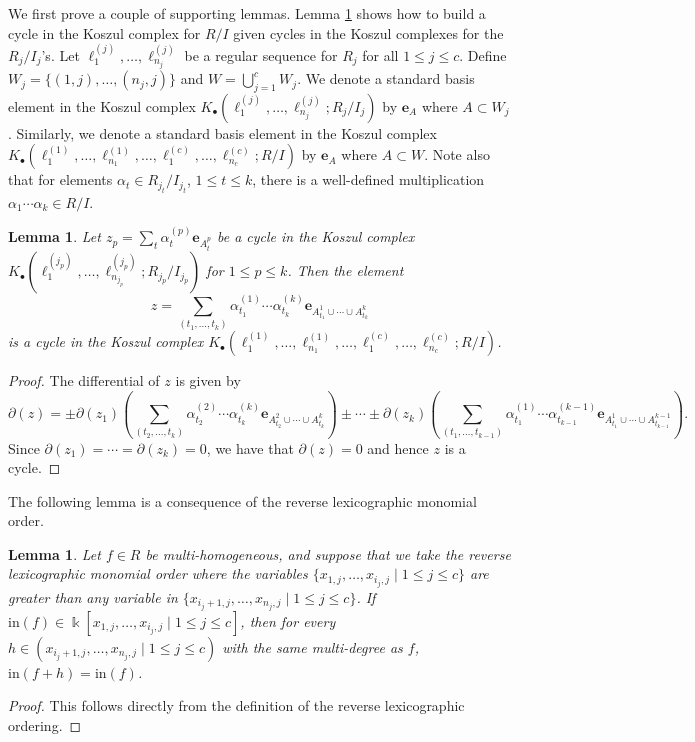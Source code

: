 \documentclass[a4paper, 10pt, reqno, english, ones]{amsart}  %
\newtheorem{lemma}[theorem]{Lemma}
\theoremstyle{definition}
\theoremstyle{remark}
\begin{document}
We first prove a couple of supporting lemmas. Lemma \ref{lem:Koszul Build} shows how to build a cycle in the Koszul complex for $R/I$ given cycles in the Koszul complexes for the $R_j/I_j$'s. Let $\ell_1^{(j)},\dots,\ell_{n_j}^{(j)}$ be a regular sequence for $R_j$ for all $1\leq j\leq c$. Define $W_j=\{(1,j),\dots,(n_j,j) \}$ and $W=\bigcup_{j=1}^c W_j$. We denote a standard basis element in the Koszul complex $K_\bullet (\ell_1^{(j)},\dots,\ell_{n_j}^{(j)};R_j/I_j)$ by $\mathbf{e}_A$ where $A\subset W_j$. Similarly, we denote a standard basis element in the Koszul complex $K_\bullet (\ell_1^{(1)},\dots,\ell_{n_1}^{(1)},\dots,\ell_1^{(c)},\dots,\ell_{n_c}^{(c)};R/I)$ by $\mathbf{e}_A$ where $A\subset W$. Note also that for elements $\alpha_t\in R_{j_t}/I_{j_t}$, $1\leq t\leq k$, there is a well-defined multiplication $\alpha_1\cdots \alpha_k \in R/I$. 

\begin{lemma}\label{lem:Koszul Build}
    Let $z_p=\sum_t \alpha_t^{(p)}\mathbf{e}_{A_t^{p}}$ be a cycle in the Koszul complex $K_\bullet (\ell_1^{(j_p)},\dots,\ell_{n_{j_p}}^{(j_p)};R_{j_p}/I_{j_p})$ for $1\leq p\leq k$. Then the element
    \[
    z=\sum_{(t_1,\dots,t_k)}  \alpha_{t_1}^{(1)}\cdots \alpha_{t_k}^{(k)} \mathbf{e}_{A_{t_1}^{1}\cup \cdots \cup A_{t_k}^{k}}
    \]
    is a cycle in the Koszul complex $K_\bullet (\ell_1^{(1)},\dots,\ell_{n_1}^{(1)},\dots,\ell_1^{(c)},\dots,\ell_{n_c}^{(c)};R/I)$.
\end{lemma}
\begin{proof}
    The differential of $z$ is given by
    \[
    \partial(z) = \pm\partial(z_1)\left(\sum_{(t_2,\dots,t_k)}  \alpha_{t_2}^{(2)}\cdots \alpha_{t_k}^{(k)} \mathbf{e}_{A_{t_2}^{2}\cup \cdots \cup A_{t_k}^{k}}\right) \pm \cdots \pm \partial(z_k)\left(\sum_{(t_1,\dots,t_{k-1})}  \alpha_{t_1}^{(1)}\cdots \alpha_{t_{k-1}}^{(k-1)} \mathbf{e}_{A_{t_1}^{1}\cup \cdots \cup A_{t_{k-1}}^{k-1}}\right).
    \]
    Since $\partial(z_1)=\cdots =\partial(z_k)=0$, we have that $\partial(z)=0$ and hence $z$ is a cycle.
\end{proof}

The following lemma is a consequence of the reverse lexicographic monomial order. 

\begin{lemma}\label{lem:ordering lem}
    Let $f \in R$ be multi-homogeneous, and suppose that we take the reverse lexicographic monomial order where the variables $\{x_{1,j},\dots,x_{i_j,j} \mid 1\leq j \leq c\}$ are greater than any variable in $\{x_{i_j+1,j},\dots,x_{n_j,j} \mid 1\leq j \leq c\}$. If $\textrm{in}(f)\in \Bbbk[x_{1,j},\dots,x_{i_j,j} \mid 1\leq j \leq c]$, then for every $h\in (x_{i_j+1,j},\dots,x_{n_j,j} \mid 1\leq j \leq c)$ with the same multi-degree as $f$, $\textrm{in}(f+h)=\textrm{in}(f)$.
\end{lemma}
\begin{proof}
    This follows directly from the definition of the reverse lexicographic ordering.
\end{proof}
\end{document}
